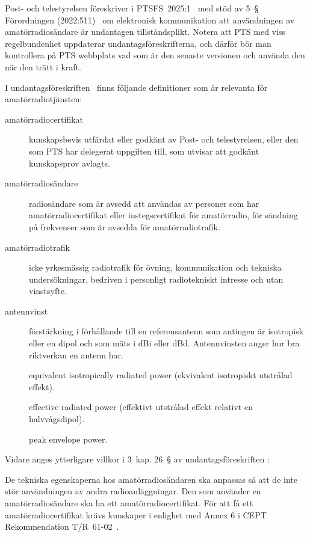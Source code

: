 Post- och telestyrelsen föreskriver i PTSFS~2025:1~\cite{PTSFS2025:1} med stöd
av 5~\S{} Förordningen (2022:511)~\cite{SFS2022:511}
om elektronisk kommunikation
att användningen av amatörradiosändare är undantagen tillståndsplikt.
Notera att PTS med viss regelbundenhet uppdaterar undantagsföreskrifterna,
och därför bör man kontrollera på PTS webbplats vad som är den senaste versionen
och använda den när den trätt i kraft.

I undantagsföreskriften~\cite{PTSFS2025:1} finns följande definitioner som är
relevanta för amatörradiotjänsten:

\begin{description}
\item[amatörradiocertifikat] kunskapsbevis utfärdat eller godkänt av
Post- och telestyrelsen, eller den som PTS har delegerat uppgiften till, som
utvisar att godkänt kunskapsprov avlagts.

\item[amatörradiosändare] radiosändare som är avsedd att användas av personer
som har amatörradiocertifikat eller instegscertifikat för amatörradio, för
sändning på frekvenser som är avsedda för amatörradiotrafik.

\item[amatörradiotrafik] icke yrkesmässig radiotrafik för övning,
kommunikation och tekniska undersökningar, bedriven i personligt radiotekniskt
intresse och utan vinstsyfte.

\item[antennvinst] förstärkning i förhållande till en referensantenn som
antingen är isotropisk eller en dipol och som mäts i dBi eller dBd.
Antennvinsten anger hur bra riktverkan en antenn har.

\item[\eirp] equivalent isotropically radiated power (ekvivalent
isotropiskt utstrålad effekt).

\item[\erp] effective radiated power (effektivt utstrålad effekt relativt en
halvvågsdipol).

\item[\pep] peak envelope power.
\end{description}
Vidare anges ytterligare villkor i 3~kap. 26~\S{} av undantagsföreskriften
\cite{PTSFS2025:1}:

De tekniska egenskaperna hos amatörradiosändaren ska anpassas så att de inte
stör användningen av andra radioanläggningar.
Den som använder en amatörradiosändare ska ha ett amatörradiocertifikat.
För att få ett amatörradiocertifikat krävs kunskaper i enlighet med Annex 6 i
CEPT Rekommendation T/R~61-02~\cite{TR6102}.

